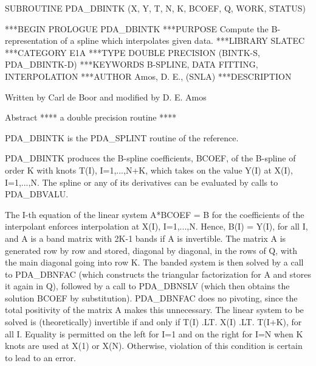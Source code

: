 \documentclass[11pt,twoside,nolof]{starlink}
\begin{document}


\begin{terminalv}
      SUBROUTINE PDA_DBINTK (X, Y, T, N, K, BCOEF, Q, WORK, STATUS)


***BEGIN PROLOGUE  PDA_DBINTK
***PURPOSE  Compute the B-representation of a spline which interpolates
            given data.
***LIBRARY   SLATEC
***CATEGORY  E1A
***TYPE      DOUBLE PRECISION (BINTK-S, PDA_DBINTK-D)
***KEYWORDS  B-SPLINE, DATA FITTING, INTERPOLATION
***AUTHOR  Amos, D. E., (SNLA)
***DESCRIPTION

     Written by Carl de Boor and modified by D. E. Amos

     Abstract    **** a double precision routine ****

         PDA_DBINTK is the PDA_SPLINT routine of the reference.

         PDA_DBINTK produces the B-spline coefficients, BCOEF, of the
         B-spline of order K with knots T(I), I=1,...,N+K, which
         takes on the value Y(I) at X(I), I=1,...,N.  The spline or
         any of its derivatives can be evaluated by calls to PDA_DBVALU.

         The I-th equation of the linear system A*BCOEF = B for the
         coefficients of the interpolant enforces interpolation at
         X(I), I=1,...,N.  Hence, B(I) = Y(I), for all I, and A is
         a band matrix with 2K-1 bands if A is invertible.  The matrix
         A is generated row by row and stored, diagonal by diagonal,
         in the rows of Q, with the main diagonal going into row K.
         The banded system is then solved by a call to PDA_DBNFAC (which
         constructs the triangular factorization for A and stores it
         again in Q), followed by a call to PDA_DBNSLV (which then
         obtains the solution BCOEF by substitution).  PDA_DBNFAC does no
         pivoting, since the total positivity of the matrix A makes
         this unnecessary.  The linear system to be solved is
         (theoretically) invertible if and only if
                 T(I) .LT. X(I) .LT. T(I+K),        for all I.
         Equality is permitted on the left for I=1 and on the right
         for I=N when K knots are used at X(1) or X(N).  Otherwise,
         violation of this condition is certain to lead to an error.


\end{terminalv}
\end{document}
